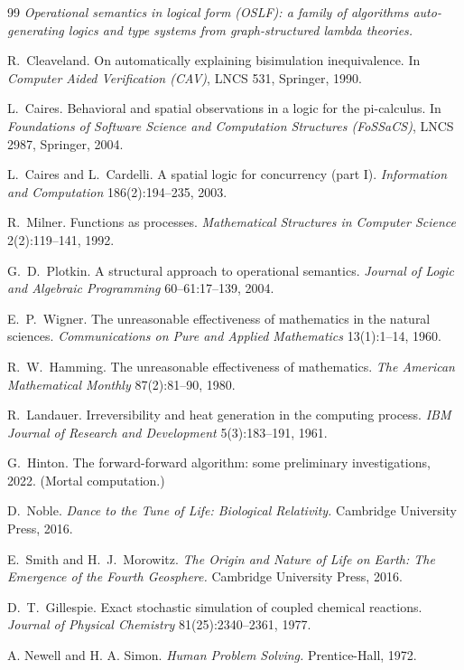 \begin{thebibliography}{99}
\emph{Operational semantics in logical form (OSLF): a family of algorithms auto-generating logics and type systems from graph-structured lambda theories.}

R.\ Cleaveland. On automatically explaining bisimulation inequivalence. In \emph{Computer Aided Verification (CAV)}, LNCS 531, Springer, 1990.

L.\ Caires. Behavioral and spatial observations in a logic for the pi-calculus. In \emph{Foundations of Software Science and Computation Structures (FoSSaCS)}, LNCS 2987, Springer, 2004.

L.\ Caires and L.\ Cardelli. A spatial logic for concurrency (part I). \emph{Information and Computation} 186(2):194--235, 2003.

R.\ Milner. Functions as processes. \emph{Mathematical Structures in Computer Science} 2(2):119--141, 1992.

G.\ D.\ Plotkin. A structural approach to operational semantics. \emph{Journal of Logic and Algebraic Programming} 60--61:17--139, 2004.

E.\ P.\ Wigner. The unreasonable effectiveness of mathematics in the natural sciences. \emph{Communications on Pure and Applied Mathematics} 13(1):1--14, 1960.

R.\ W.\ Hamming. The unreasonable effectiveness of mathematics. \emph{The American Mathematical Monthly} 87(2):81--90, 1980.

R.\ Landauer. Irreversibility and heat generation in the computing process. \emph{IBM Journal of Research and Development} 5(3):183--191, 1961.

G.\ Hinton. The forward-forward algorithm: some preliminary investigations, 2022. (Mortal computation.)

D.\ Noble. \emph{Dance to the Tune of Life: Biological Relativity.} Cambridge University Press, 2016.

E.\ Smith and H.\ J.\ Morowitz. \emph{The Origin and Nature of Life on Earth: The Emergence of the Fourth Geosphere.} Cambridge University Press, 2016.

D.\ T.\ Gillespie. Exact stochastic simulation of coupled chemical reactions. \emph{Journal of Physical Chemistry} 81(25):2340--2361, 1977.

A. Newell and H. A. Simon. \emph{Human Problem Solving.} Prentice-Hall, 1972.


\end{thebibliography}
